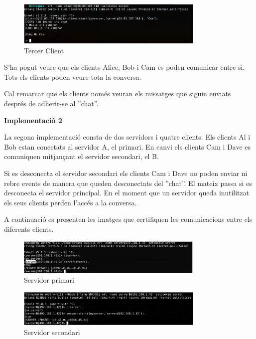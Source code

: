 \documentclass[a4paper, 11pt]{article}
\begin{document}
\begin{figure}[H]
    \centering   
	\includegraphics[width=0.8\textwidth]{figures/Server1_Cam}
    \caption{Tercer Client \label{fig:Impl1_Cam}}	
\end{figure}

S'ha pogut veure que els clients Alice, Bob i Cam es poden comunicar entre si. Tots els clients poden veure tota la conversa. 

Cal remarcar que els clients només veuran els missatges que siguin enviats després de adherir-se al ''chat''.


\begin{center} 
    \textbf{Implementació 2}
\end{center}

La segona implementació consta de dos servidors i quatre clients. Els clients Al i Bob estan conectats al servidor A, el primari. En canvi els clients Cam i Dave es comuniquen mitjançant el servidor secondari, el B.

Si es desconecta el servidor secondari els clients Cam i Dave no poden enviar ni rebre events de manera que queden desconectats del ''chat''. El mateix passa si es desconecta el servidor principal. 
En el moment que un servidor queda inutilitzat els seus clients perden l'accés a la conversa.

A continuació es presenten les imatges que certifiquen les comunicacions entre els diferents clients. 

\begin{figure}[H]
	\centering
    \includegraphics[width=0.8\textwidth]{figures/ServerA}
    \caption{Servidor primari \label{fig:firstserver}}    
\end{figure}

\begin{figure}[H]
	\centering
    \includegraphics[width=0.8\textwidth]{figures/ServerB}
    \caption{Servidor secondari \label{fig:secondserver}}    
\end{figure}
\end{document}
